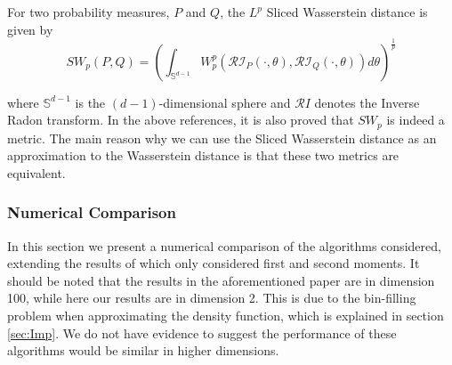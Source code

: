 \begin{defn}
For two probability measures, $P$ and $Q$, the $L^p$ Sliced Wasserstein distance is given by
$$
SW_p(P,Q) = \left(\int_{\mathbb S^{d-1} }  W_p^p\left(\mathcal{RI}_P(\cdot, \theta), \mathcal{RI}_Q(\cdot, \theta) \right) d \theta \right)^{\frac 1 p}
$$
\end{defn}

where $\mathbb S^{d-1}$ is the $(d-1)$-dimensional sphere and $\mathcal RI$ denotes the Inverse Radon transform. In the above references, it is also proved that $SW_p$ is indeed a metric. The main reason why we can use the Sliced Wasserstein distance as an approximation to the Wasserstein distance is that these two metrics are equivalent\cite{Santa}.

\subsubsection{Numerical Comparison}
In this section we present a numerical comparison of the algorithms considered, extending the results of \cite{Brosse18tULA} which only considered first and second moments.  It should be noted that the results in the aforementioned paper are in dimension 100, while here our results are in dimension 2.  This is due to the bin-filling problem when approximating the density function, which is explained in section \ref{sec:Imp}.  We do not have evidence to suggest the performance of these algorithms would be similar in higher dimensions.

